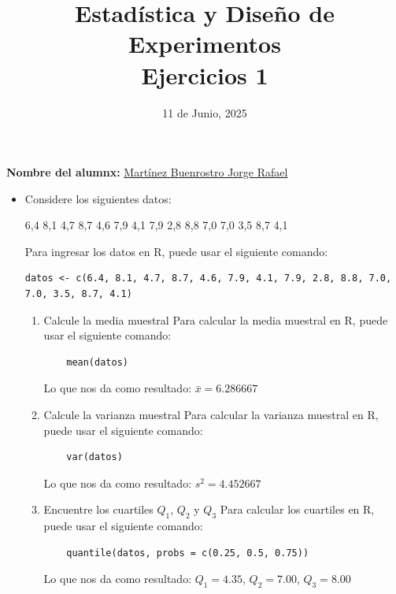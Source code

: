 \documentclass[12pt,a4paper]{article}
\title{Estadística y Diseño de Experimentos\\
Ejercicios 1}
\date{11 de Junio, 2025}
\author{}
\begin{document}
\maketitle

\noindent\textbf{Nombre del alumnx:} \underline{\hspace{0.5cm}Martínez Buenrostro Jorge Rafael\hspace{0.5cm}}

\vspace{1cm}

\begin{itemize}
\item Considere los siguientes datos:

\begin{center}
6,4 8,1 4,7 8,7 4,6 7,9 4,1 7,9 2,8 8,8 7,0 7,0 3,5 8,7 4,1
\end{center}

Para ingresar los datos en R, puede usar el siguiente comando:
\begin{lstlisting}
datos <- c(6.4, 8.1, 4.7, 8.7, 4.6, 7.9, 4.1, 7.9, 2.8, 8.8, 7.0, 7.0, 3.5, 8.7, 4.1)
\end{lstlisting}

\begin{enumerate}
\item Calcule la media muestral
Para calcular la media muestral en R, puede usar el siguiente comando:
\begin{lstlisting}
    mean(datos)
\end{lstlisting}
Lo que nos da como resultado: \(\bar{x} = 6.286667\)
\vspace{1cm}

\item Calcule la varianza muestral
Para calcular la varianza muestral en R, puede usar el siguiente comando:
\begin{lstlisting}
    var(datos)
\end{lstlisting}
Lo que nos da como resultado: \(s^2 = 4.452667\)
\vspace{1cm}

\item Encuentre los cuartiles $Q_1$, $Q_2$ y $Q_3$
Para calcular los cuartiles en R, puede usar el siguiente comando:
\begin{lstlisting}
    quantile(datos, probs = c(0.25, 0.5, 0.75))
\end{lstlisting}
Lo que nos da como resultado: \(Q_1 = 4.35\), \(Q_2 = 7.00\), \(Q_3 = 8.00\)
\vspace{1cm}


\end{enumerate}
\end{itemize}
\end{document}
